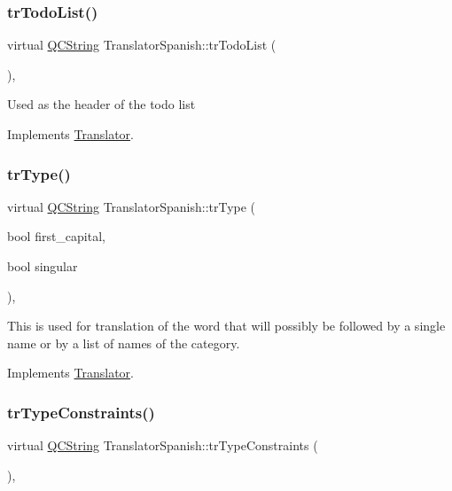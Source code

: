 \subsubsection{\texorpdfstring{trTodoList()}{trTodoList()}}
{\footnotesize\ttfamily virtual \mbox{\hyperlink{class_q_c_string}{Q\+C\+String}} Translator\+Spanish\+::tr\+Todo\+List (\begin{DoxyParamCaption}{ }\end{DoxyParamCaption})\hspace{0.3cm}{\ttfamily [inline]}, {\ttfamily [virtual]}}

Used as the header of the todo list 

Implements \mbox{\hyperlink{class_translator}{Translator}}.

\mbox{\label{class_translator_spanish_a1bfcf19d16990efb94db4f5423436e5c}} 
\subsubsection{\texorpdfstring{trType()}{trType()}}
{\footnotesize\ttfamily virtual \mbox{\hyperlink{class_q_c_string}{Q\+C\+String}} Translator\+Spanish\+::tr\+Type (\begin{DoxyParamCaption}\item[{bool}]{first\+\_\+capital,  }\item[{bool}]{singular }\end{DoxyParamCaption})\hspace{0.3cm}{\ttfamily [inline]}, {\ttfamily [virtual]}}

This is used for translation of the word that will possibly be followed by a single name or by a list of names of the category. 

Implements \mbox{\hyperlink{class_translator}{Translator}}.

\mbox{\label{class_translator_spanish_adfda63356fc48b2c634335b0f7cd3c16}} 
\subsubsection{\texorpdfstring{trTypeConstraints()}{trTypeConstraints()}}
{\footnotesize\ttfamily virtual \mbox{\hyperlink{class_q_c_string}{Q\+C\+String}} Translator\+Spanish\+::tr\+Type\+Constraints (\begin{DoxyParamCaption}{ }\end{DoxyParamCaption})\hspace{0.3cm}{\ttfamily [inline]}, {\ttfamily [virtual]}}

